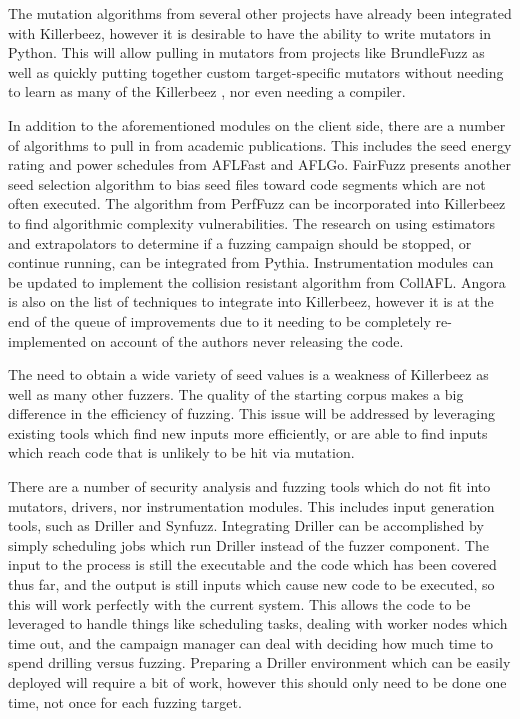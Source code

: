 The mutation algorithms from several other projects have already been
integrated with Killerbeez, however it is desirable to have the ability
to write mutators in Python.  This will allow pulling in mutators from
projects like BrundleFuzz\cite{brundlefuzz} as well as quickly putting
together custom target-specific mutators without needing to learn as many of the Killerbeez
\APIs{}, nor even needing a compiler.

In addition to the aforementioned modules on the client side, there are a number
of algorithms to pull in from academic publications.  This includes the seed
energy rating and power schedules from AFLFast\cite{aflfast} and
AFLGo.\cite{aflgo} FairFuzz presents another seed selection algorithm to bias
seed files toward code segments which are not often executed.\cite{fairfuzz}
The algorithm from PerfFuzz\cite{perffuzz} can be incorporated into
Killerbeez to find algorithmic complexity vulnerabilities. The research on
using estimators and extrapolators to determine if a fuzzing campaign should
be stopped, or continue running, can be integrated from Pythia.\cite{pythia}
Instrumentation modules can be updated to implement the collision resistant
algorithm from CollAFL.\cite{collafl} Angora is also on the list of techniques
to integrate into Killerbeez, however it is at the end of the queue of
improvements due to it needing to be completely re-implemented
on account of the authors never releasing the code.\cite{angora}

The need to obtain a wide variety of seed values is a weakness of Killerbeez
as well as many other fuzzers. The quality of the starting corpus makes a big
difference in the efficiency of fuzzing. This issue will be addressed by leveraging
existing tools which find new inputs more efficiently, or are able to find
inputs which reach code that is unlikely to be hit via mutation.

There are a number of security analysis and fuzzing tools which do not
fit into mutators, drivers, nor instrumentation modules. This includes input
generation tools, such as Driller\cite{driller} and Synfuzz\cite{synfuzz}.
Integrating Driller can be accomplished by simply scheduling \BOINC{} jobs
which run Driller instead of the fuzzer component. The input to the process
is still the executable and the code which has been covered thus far, and the
output is still inputs which cause new code to be executed, so this will work
perfectly with the current system.  This allows the \BOINC{} code to be
leveraged to handle things like scheduling tasks, dealing with worker nodes
which time out, and the campaign manager can deal with deciding how much time
to spend drilling versus fuzzing. Preparing a Driller environment which can
be easily deployed will require a bit of work, however this should only need
to be done one time, not once for each fuzzing target.

